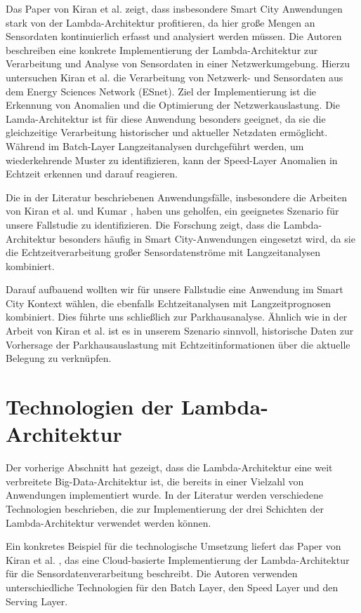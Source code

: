 Das Paper von Kiran et al. \cite{kiran2015lambda} zeigt, dass insbesondere Smart City Anwendungen stark von der Lambda-Architektur profitieren, da hier große Mengen an Sensordaten kontinuierlich erfasst und analysiert werden müssen. Die Autoren beschreiben eine konkrete Implementierung der Lambda-Architektur zur Verarbeitung und Analyse von Sensordaten in einer Netzwerkumgebung. Hierzu untersuchen Kiran et al. die Verarbeitung von Netzwerk- und Sensordaten aus dem Energy Sciences Network (ESnet). Ziel der Implementierung ist die Erkennung von Anomalien und die Optimierung der Netzwerkauslastung. Die Lamda-Architektur ist für diese Anwendung besonders geeignet, da sie die gleichzeitige Verarbeitung historischer und aktueller Netzdaten ermöglicht. Während im Batch-Layer Langzeitanalysen durchgeführt werden, um wiederkehrende Muster zu identifizieren, kann der Speed-Layer Anomalien in Echtzeit erkennen und darauf reagieren. 

Die in der Literatur beschriebenen Anwendungsfälle, insbesondere die Arbeiten von Kiran et al. \cite{kiran2015lambda} und Kumar \cite{kumar2020lambda}, haben uns geholfen, ein geeignetes Szenario für unsere Fallstudie zu identifizieren. Die Forschung zeigt, dass die Lambda-Architektur besonders häufig in Smart City-Anwendungen eingesetzt wird, da sie die Echtzeitverarbeitung großer Sensordatenströme mit Langzeitanalysen kombiniert.

Darauf aufbauend wollten wir für unsere Fallstudie eine Anwendung im Smart City Kontext wählen, die ebenfalls Echtzeitanalysen mit Langzeitprognosen kombiniert. Dies führte uns schließlich zur Parkhausanalyse. Ähnlich wie in der Arbeit von Kiran et al. \cite{kiran2015lambda} ist es in unserem Szenario sinnvoll, historische Daten zur Vorhersage der Parkhausauslastung mit Echtzeitinformationen über die aktuelle Belegung zu verknüpfen.

\section{Technologien der Lambda-Architektur}
Der vorherige Abschnitt hat gezeigt, dass die Lambda-Architektur eine weit verbreitete Big-Data-Architektur ist, die bereits in einer Vielzahl von Anwendungen implementiert wurde. In der Literatur werden verschiedene Technologien beschrieben, die zur Implementierung der drei Schichten der Lambda-Architektur verwendet werden können.

Ein konkretes Beispiel für die technologische Umsetzung liefert das Paper von Kiran et al. \cite{kiran2015lambda}, das eine Cloud-basierte Implementierung der Lambda-Architektur für die Sensordatenverarbeitung beschreibt. Die Autoren verwenden unterschiedliche Technologien für den Batch Layer, den Speed Layer und den Serving Layer.

